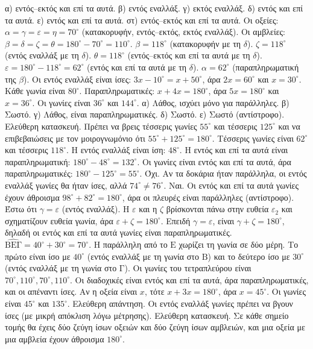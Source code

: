  α) εντός--εκτός και επί τα αυτά. β) εντός εναλλάξ. γ) εκτός εναλλάξ. δ) εντός και επί τα αυτά. ε) εντός και επί τα αυτά. στ) εντός--εκτός και επί τα αυτά.
 Οι οξείες: $\alpha=\gamma=\varepsilon=\eta=70^\circ$ (κατακορυφήν, εντός--εκτός, εκτός εναλλάξ). Οι αμβλείες: $\beta=\delta=\zeta=\theta=180^\circ-70^\circ=110^\circ$.
 $\beta=118^\circ$ (κατακορυφήν με τη $\delta$). $\zeta=118^\circ$ (εντός εναλλάξ με τη $\delta$). $\theta=118^\circ$ (εντός--εκτός και επί τα αυτά με τη $\delta$). $\varepsilon=180^\circ-118^\circ=62^\circ$ (εντός και επί τα αυτά με τη $\delta$). $\alpha=62^\circ$ (παραπληρωματική της $\beta$).
 Οι εντός εναλλάξ είναι ίσες: $3x-10^\circ=x+50^\circ$, άρα $2x=60^\circ$ και $x=30^\circ$. Κάθε γωνία είναι $80^\circ$.
 Παραπληρωματικές: $x+4x=180^\circ$, άρα $5x=180^\circ$ και $x=36^\circ$. Οι γωνίες είναι $36^\circ$ και $144^\circ$.
 α) Λάθος, ισχύει μόνο για παράλληλες. β) Σωστό. γ) Λάθος, είναι παραπληρωματικές. δ) Σωστό. ε) Σωστό (αντίστροφο).
 Ελεύθερη κατασκευή. Πρέπει να βρεις τέσσερις γωνίες $55^\circ$ και τέσσερις $125^\circ$ και να επιβεβαιώσεις με τον μοιρογνωμόνιο ότι $55^\circ+125^\circ=180^\circ$.
 Τέσσερις γωνίες είναι $62^\circ$ και τέσσερις $118^\circ$.
 Η εντός εναλλάξ είναι ίση: $48^\circ$. Η εντός και επί τα αυτά είναι παραπληρωματική: $180^\circ-48^\circ=132^\circ$.
 Οι γωνίες είναι εντός και επί τα αυτά, άρα παραπληρωματικές: $180^\circ-125^\circ=55^\circ$.
 Όχι. Αν τα δοκάρια ήταν παράλληλα, οι εντός εναλλάξ γωνίες θα ήταν ίσες, αλλά $74^\circ\neq76^\circ$.
 Ναι. Οι εντός και επί τα αυτά γωνίες έχουν άθροισμα $98^\circ+82^\circ=180^\circ$, άρα οι πλευρές είναι παράλληλες (αντίστροφο).
 Έστω ότι $\gamma=\varepsilon$ (εντός εναλλάξ). Η $\varepsilon$ και η $\zeta$ βρίσκονται πάνω στην ευθεία $\varepsilon_2$ και σχηματίζουν ευθεία γωνία, άρα $\varepsilon+\zeta=180^\circ$. Επειδή $\gamma=\varepsilon$, είναι $\gamma+\zeta=180^\circ$, δηλαδή οι εντός και επί τα αυτά γωνίες είναι παραπληρωματικές.
 $\widehat{\mathrm{ΒΕΓ}}=40^\circ+30^\circ=70^\circ$. Η παράλληλη από το $\mathrm{Ε}$ χωρίζει τη γωνία σε δύο μέρη. Το πρώτο είναι ίσο με $40^\circ$ (εντός εναλλάξ με τη γωνία στο $\mathrm{Β}$) και το δεύτερο ίσο με $30^\circ$ (εντός εναλλάξ με τη γωνία στο $\mathrm{Γ}$).
 Οι γωνίες του τετραπλεύρου είναι $70^\circ,110^\circ,70^\circ,110^\circ$. Οι διαδοχικές είναι εντός και επί τα αυτά, άρα παραπληρωματικές, και οι απέναντι ίσες.
 Αν η οξεία είναι $x$, τότε $x+3x=180^\circ$, άρα $x=45^\circ$. Οι γωνίες είναι $45^\circ$ και $135^\circ$.
 Ελεύθερη απάντηση. Οι εντός εναλλάξ γωνίες πρέπει να βγουν ίσες (με μικρή απόκλιση λόγω μέτρησης).
 Ελεύθερη κατασκευή. Σε κάθε σημείο τομής θα έχεις δύο ζεύγη ίσων οξειών και δύο ζεύγη ίσων αμβλειών, και μια οξεία με μια αμβλεία έχουν άθροισμα $180^\circ$.
